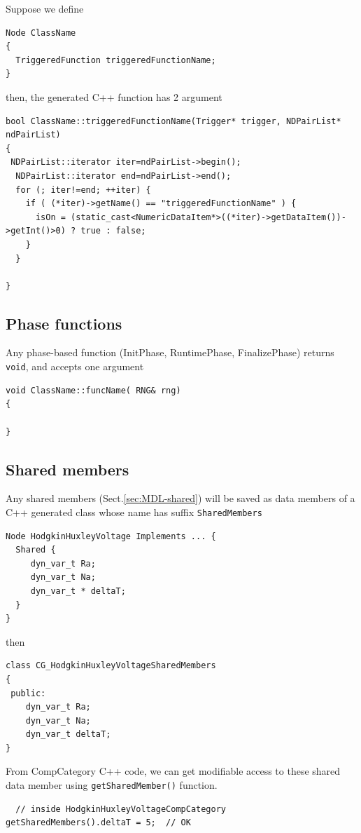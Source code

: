 Suppose we define
\begin{verbatim}
Node ClassName
{
  TriggeredFunction triggeredFunctionName;
}
\end{verbatim}

then, the generated C++ function has 2 argument
\begin{verbatim}
bool ClassName::triggeredFunctionName(Trigger* trigger, NDPairList* ndPairList)
{
 NDPairList::iterator iter=ndPairList->begin();
  NDPairList::iterator end=ndPairList->end();
  for (; iter!=end; ++iter) {
    if ( (*iter)->getName() == "triggeredFunctionName" ) {
      isOn = (static_cast<NumericDataItem*>((*iter)->getDataItem())->getInt()>0) ? true : false;
    }
  }

}
\end{verbatim}

\subsection{Phase functions}

Any phase-based function (InitPhase, RuntimePhase, FinalizePhase) returns
\verb!void!, and accepts one argument
\begin{verbatim}
void ClassName::funcName( RNG& rng)
{

}
\end{verbatim}

\subsection{Shared members}
\label{sec:MDL-shared-members}

Any shared members (Sect.\ref{sec:MDL-shared}) will be saved as data members of
a C++ generated class whose name has suffix \verb!SharedMembers!
\begin{verbatim}
Node HodgkinHuxleyVoltage Implements ... {
  Shared {
     dyn_var_t Ra;
     dyn_var_t Na;
     dyn_var_t * deltaT;
  }  
}
\end{verbatim}

then 
\begin{verbatim}
class CG_HodgkinHuxleyVoltageSharedMembers
{
 public:
    dyn_var_t Ra;
    dyn_var_t Na;
    dyn_var_t deltaT;
}
\end{verbatim}

From CompCategory C++ code, we can get modifiable access to these shared data
member using \verb!getSharedMember()! function.

\begin{verbatim}
  // inside HodgkinHuxleyVoltageCompCategory
getSharedMembers().deltaT = 5;  // OK
\end{verbatim}

